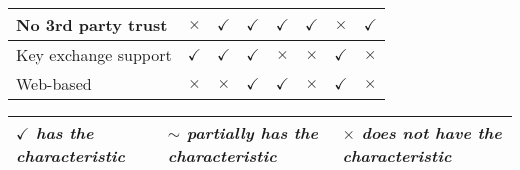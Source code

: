 {\begin{landscape}
\begin{table}[]
\begin{tabular}{|l|c|c|c|c|c|c|c|}
No 3rd party trust                                                       & $\times$                                                                             & $\checkmark$                                                                             & $\checkmark$                                                                            & $\checkmark$                                & $\checkmark$                                                                             & $\times$                                                                                 & $\checkmark$                                \\ \hline
Key exchange support                                                          & $\checkmark$                                                                             & $\checkmark$                                                                             & $\checkmark$                                                                            & $\times$                                & $\times$                                                                             & $\checkmark$                                                                                 & $\times$                                \\ \hline
Web-based                                                                     & $\times$                                                                             & $\times$                                                                             & $\checkmark$                                                                            & $\checkmark$                                & $\times$                                                                             & $\checkmark$                                                                                 & $\times$                                \\ \hline
\end{tabular}
\end{table}

\begin{table}[]
\centering
\begin{tabular}{|l|l|l|}
\hline
{\it $\checkmark$ has the characteristic} & {\it $\sim$ partially has the characteristic} & {\it $\times$ does not have the characteristic} \\ \hline
\end{tabular}
\end{table}

  \end{landscape}
  \clearpage
}

\clearpage
